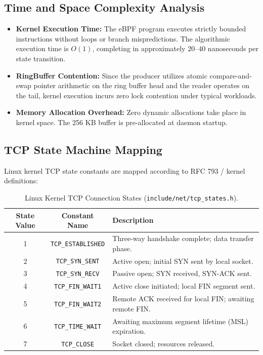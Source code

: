 \documentclass[11pt,a4paper]{article}
\begin{document}
\subsection{Time and Space Complexity Analysis}
\begin{itemize}
    \item \textbf{Kernel Execution Time:} The eBPF program executes strictly bounded instructions without loops or branch mispredictions. The algorithmic execution time is $O(1)$, completing in approximately $20\text{--}40$ nanoseconds per state transition.
    \item \textbf{RingBuffer Contention:} Since the producer utilizes atomic compare-and-swap pointer arithmetic on the ring buffer head and the reader operates on the tail, kernel execution incurs zero lock contention under typical workloads.
    \item \textbf{Memory Allocation Overhead:} Zero dynamic allocations take place in kernel space. The 256 KB buffer is pre-allocated at daemon startup.
\end{itemize}

\subsection{TCP State Machine Mapping}
Linux kernel TCP state constants are mapped according to RFC 793 / kernel definitions:
\begin{table}[h!]
\centering
\small
\begin{tabular}{@{}ccl@{}}
\toprule
\textbf{State Value} & \textbf{Constant Name} & \textbf{Description} \\ \midrule
1 & \texttt{TCP\_ESTABLISHED} & Three-way handshake complete; data transfer phase. \\
2 & \texttt{TCP\_SYN\_SENT} & Active open; initial SYN sent by local socket. \\
3 & \texttt{TCP\_SYN\_RECV} & Passive open; SYN received, SYN-ACK sent. \\
4 & \texttt{TCP\_FIN\_WAIT1} & Active close initiated; local FIN segment sent. \\
5 & \texttt{TCP\_FIN\_WAIT2} & Remote ACK received for local FIN; awaiting remote FIN. \\
6 & \texttt{TCP\_TIME\_WAIT} & Awaiting maximum segment lifetime (MSL) expiration. \\
7 & \texttt{TCP\_CLOSE} & Socket closed; resources released. \\
\bottomrule
\end{tabular}
\caption{Linux Kernel TCP Connection States (\texttt{include/net/tcp\_states.h}).}
\label{tab:tcpstates}
\end{table}
\end{document}
